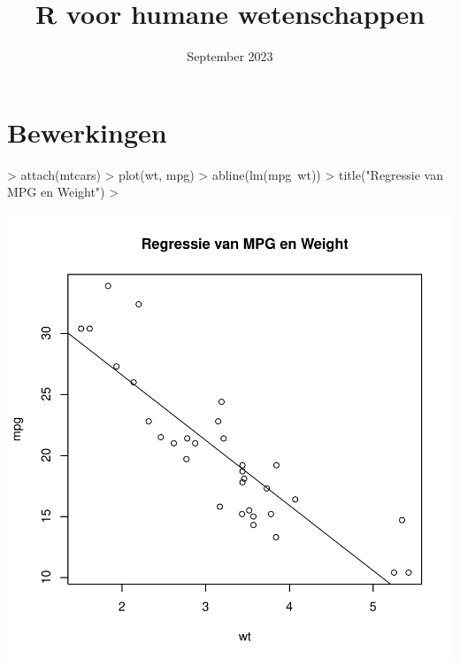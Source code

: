 \documentclass[a4paper,12pt, dutch, oneside ]{book}
\begin{document}
\title{R voor humane wetenschappen}
\date{September 2023}



%



\section{Bewerkingen}

\begin{Schunk}
\begin{Sinput}
> attach(mtcars)
> plot(wt, mpg)
> abline(lm(mpg~wt))
> title("Regressie van MPG en Weight")
> 
\end{Sinput}
\end{Schunk}
\includegraphics{hoofd-t}
\end{document}
